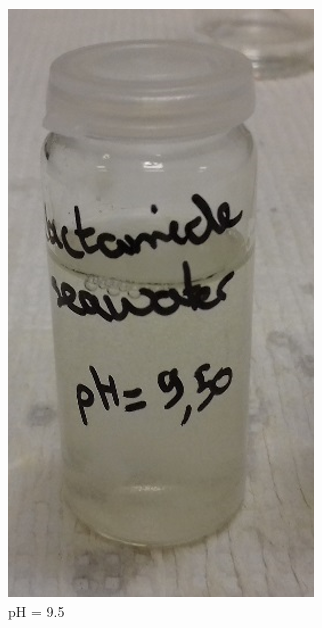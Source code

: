 \begin{figure}
\begin{subfigure}[b]{0.28\textwidth}
         \centering
         \includegraphics[width=\textwidth]{img/fig/ph2.png}
         \caption{pH = 9.5}
     \end{subfigure}
     \hfill
     \begin{subfigure}[b]{0.3\textwidth}
         \centering

\end{subfigure}
\end{figure}
